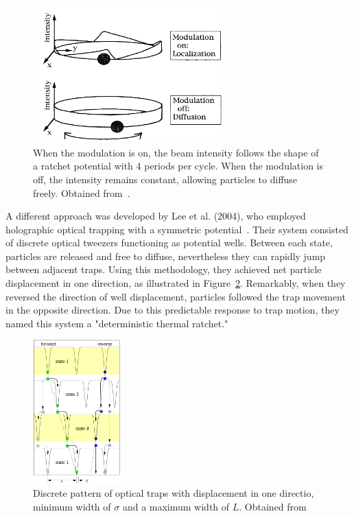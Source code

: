 \begin{figure}[h]
  \begin{center}
    \includegraphics[width=0.65\textwidth]{figures/FaucheuxExperiment.png}
  \end{center}
  \caption[Optical thermal ratchet by Faucheux]{When the modulation is on, the beam intensity follows the shape of a ratchet potential with 4 periods per cycle. When the modulation is off, the intensity remains constant, allowing particles to diffuse freely. Obtained from~\cite{faucheux1995optical}.}\label{fig:faucheuxexperiment}
\end{figure}

A different approach was developed by Lee et al. (2004), who employed holographic optical trapping with a symmetric potential~\cite{lee2005observation}. Their system consisted of discrete optical tweezers functioning as potential wells. Between each state, particles are released and free to diffuse, nevertheless they can rapidly jump between adjacent traps. Using this methodology, they achieved net particle displacement in one direction, as illustrated in Figure~\ref{fig:deterministicthermalratchet}. Remarkably, when they reversed the direction of well displacement, particles followed the trap movement in the opposite direction. Due to this predictable response to trap motion, they named this system a "deterministic thermal ratchet."


 \begin{figure}[h]
  \begin{center}
    \includegraphics[width=0.30\textwidth]{figures/DeterministicThermalRatchet.png}
  \end{center}
  \caption[Deterministic thermal ratchet by Lee et al.]{Discrete pattern of optical traps with displacement in one directio, minimum width of $\sigma$ and a maximum width of $L$. Obtained from~\cite{lee2005observation}}\label{fig:deterministicthermalratchet}
 \end{figure}

